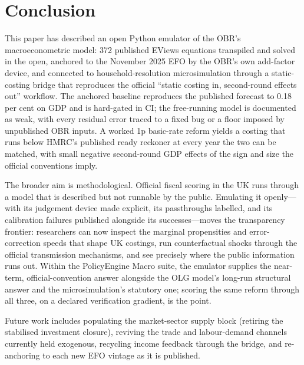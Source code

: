 \section{Conclusion}
\label{sec:conclusion}

This paper has described an open Python emulator of the OBR's macroeconometric model: 372 published EViews equations transpiled and solved in the open, anchored to the November 2025 EFO by the OBR's own add-factor device, and connected to household-resolution microsimulation through a static-costing bridge that reproduces the official ``static costing in, second-round effects out'' workflow. The anchored baseline reproduces the published forecast to 0.18 per cent on GDP and is hard-gated in CI; the free-running model is documented as weak, with every residual error traced to a fixed bug or a floor imposed by unpublished OBR inputs. A worked 1p basic-rate reform yields a costing that runs below HMRC's published ready reckoner at every year the two can be matched, with small negative second-round GDP effects of the sign and size the official conventions imply.

The broader aim is methodological. Official fiscal scoring in the UK runs through a model that is described but not runnable by the public. Emulating it openly---with its judgement device made explicit, its passthroughs labelled, and its calibration failures published alongside its successes---moves the transparency frontier: researchers can now inspect the marginal propensities and error-correction speeds that shape UK costings, run counterfactual shocks through the official transmission mechanisms, and see precisely where the public information runs out. Within the PolicyEngine Macro suite, the emulator supplies the near-term, official-convention answer alongside the OLG model's long-run structural answer and the microsimulation's statutory one; scoring the same reform through all three, on a declared verification gradient, is the point.

Future work includes populating the market-sector supply block (retiring the stabilised investment closure), reviving the trade and labour-demand channels currently held exogenous, recycling income feedback through the bridge, and re-anchoring to each new EFO vintage as it is published.
